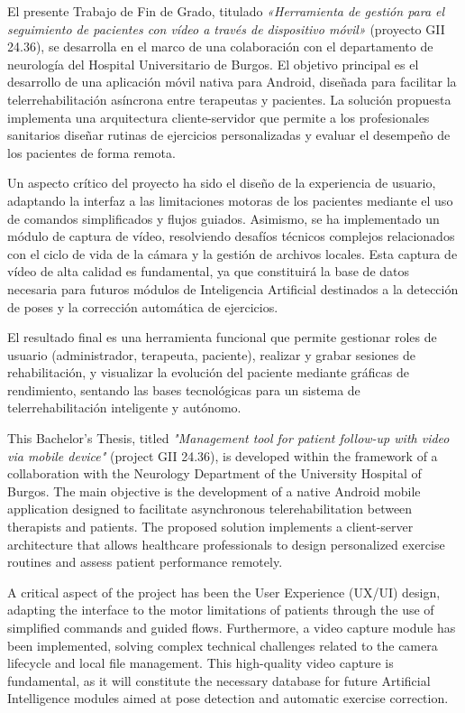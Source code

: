 
El presente Trabajo de Fin de Grado, titulado \textit{«Herramienta de gestión para el seguimiento de pacientes con vídeo a través de dispositivo móvil»} (proyecto GII 24.36), se desarrolla en el marco de una colaboración con el departamento de neurología del Hospital Universitario de Burgos. El objetivo principal es el desarrollo de una aplicación móvil nativa para Android, diseñada para facilitar la telerrehabilitación asíncrona entre terapeutas y pacientes. La solución propuesta implementa una arquitectura cliente-servidor que permite a los profesionales sanitarios diseñar rutinas de ejercicios personalizadas y evaluar el desempeño de los pacientes de forma remota.

Un aspecto crítico del proyecto ha sido el diseño de la experiencia de usuario, adaptando la interfaz a las limitaciones motoras de los pacientes mediante el uso de comandos simplificados y flujos guiados. Asimismo, se ha implementado un módulo de captura de vídeo, resolviendo desafíos técnicos complejos relacionados con el ciclo de vida de la cámara y la gestión de archivos locales. Esta captura de vídeo de alta calidad es fundamental, ya que constituirá la base de datos necesaria para futuros módulos de Inteligencia Artificial destinados a la detección de poses y la corrección automática de ejercicios.

El resultado final es una herramienta funcional que permite gestionar roles de usuario (administrador, terapeuta, paciente), realizar y grabar sesiones de rehabilitación, y visualizar la evolución del paciente mediante gráficas de rendimiento, sentando las bases tecnológicas para un sistema de telerrehabilitación inteligente y autónomo.


This Bachelor's Thesis, titled \textit{"Management tool for patient follow-up with video via mobile device"} (project GII 24.36), is developed within the framework of a collaboration with the Neurology Department of the University Hospital of Burgos. The main objective is the development of a native Android mobile application designed to facilitate asynchronous telerehabilitation between therapists and patients. The proposed solution implements a client-server architecture that allows healthcare professionals to design personalized exercise routines and assess patient performance remotely.

A critical aspect of the project has been the User Experience (UX/UI) design, adapting the interface to the motor limitations of patients through the use of simplified commands and guided flows. Furthermore, a video capture module has been implemented, solving complex technical challenges related to the camera lifecycle and local file management. This high-quality video capture is fundamental, as it will constitute the necessary database for future Artificial Intelligence modules aimed at pose detection and automatic exercise correction.

